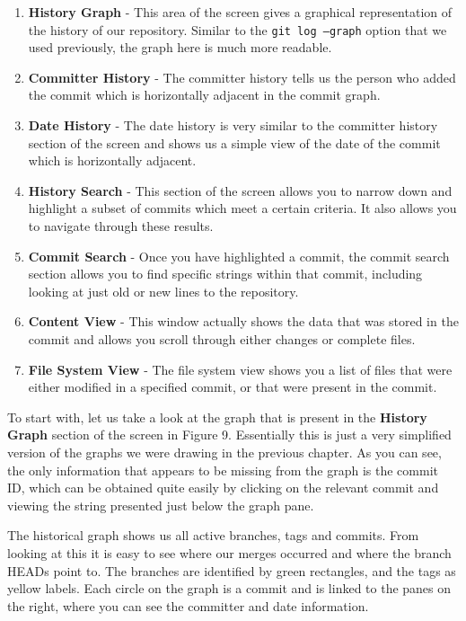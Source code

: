\begin{enumerate}
\item \textbf{History Graph} - This area of the screen gives a graphical representation of the history of our repository.
Similar to the \texttt{git log --graph} option that we used previously, the graph here is much more readable.
\item \textbf{Committer History} - The committer history tells us the person who added the commit which is horizontally adjacent in the commit graph.
\item \textbf{Date History} - The date history is very similar to the committer history section of the screen and shows us a simple view of the date of the commit which is horizontally adjacent.
\item \textbf{History Search} - This section of the screen allows you to narrow down and highlight a subset of commits which meet a certain criteria.
It also allows you to navigate through these results.
\item \textbf{Commit Search} - Once you have highlighted a commit, the commit search section allows you to find specific strings within that commit, including looking at just old or new lines to the repository.
\item \textbf{Content View} - This window actually shows the data that was stored in the commit and allows you scroll through either changes or complete files.
\item \textbf{File System View} - The file system view shows you a list of files that were either modified in a specified commit, or that were present in the commit.
\end{enumerate}

To start with, let us take a look at the graph that is present in the \textbf{History Graph} section of the screen in Figure 9.
Essentially this is just a very simplified version of the graphs we were drawing in the previous chapter.
As you can see, the only information that appears to be missing from the graph is the commit ID, which can be obtained quite easily by clicking on the relevant commit and viewing the string presented just below the graph pane.


The historical graph shows us all active branches, tags and commits.
From looking at this it is easy to see where our merges occurred and where the branch HEADs point to.
The branches are identified by green rectangles, and the tags as yellow labels.
Each circle on the graph is a commit and is linked to the panes on the right, where you can see the committer and date information.

